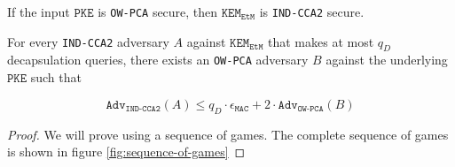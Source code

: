 \documentclass[floatrow,journal=tches,submission]{iacrtrans}
\newcommand{\monospace}{\texttt}
\newcommand{\pke}{\monospace{PKE}}
\newcommand{\kem}{\monospace{KEM}}
\newcommand{\etm}{\monospace{EtM}}  %
\newcommand{\mac}{\monospace{MAC}}
\begin{document}
If the input $\pke$ is \monospace{OW-PCA} secure, then $\kem_\etm$ is \monospace{IND-CCA2} secure.

\begin{theorem}\label{thm:ow-pca-implies-kem-ind-cca2}
    For every \monospace{IND-CCA2} adversary $A$ against $\kem_\etm$ that makes at most $q_D$ decapsulation queries, there exists an \monospace{OW-PCA} adversary $B$ against the underlying $\pke$ such that

    \begin{equation*}
        \monospace{Adv}_\monospace{IND-CCA2}(A) \leq q_D \cdot \epsilon_\mac + 2 \cdot \monospace{Adv}_\monospace{OW-PCA}(B)
    \end{equation*}
\end{theorem}

\begin{proof}
    We will prove using a sequence of games. The complete sequence of games is shown in figure \ref{fig:sequence-of-games}


\end{proof}
\end{document}
